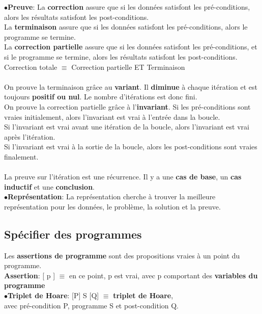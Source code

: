 $\bullet$\textbf{Preuve}:
La \textbf{correction} assure que si les données satisfont les pré-conditions, alors les résultats satisfont les post-conditions.\\
La \textbf{terminaison} assure que si les données satisfont les pré-conditions, alors le programme se termine.\\
La \textbf{correction partielle} assure que si les données satisfont les pré-conditions, et si le programme se termine, alors les résultats satisfont les post-conditions.\\
Correction totale $\equiv$ Correction partielle ET Terminaison
\\ \vspace{1,5mm}\\
On prouve la terminaison grâce au \textbf{variant}. Il \textbf{diminue} à chaque itération et est toujours \textbf{positif ou nul}. Le nombre d'itérations est donc fini.\\
On prouve la correction partielle grâce à l'\textbf{invariant}. Si les pré-conditions sont vraies initialement, alors l'invariant est vrai à l'entrée dans la boucle.\\ Si l'invariant est vrai avant une itération de la boucle, alors l'invariant est vrai après l'itération.\\ Si l'invariant est vrai à la sortie de la boucle, alors les post-conditions sont vraies finalement.\\ \vspace{1,5mm}\\
La preuve sur l'itération est une récurrence. Il y a une \textbf{cas de base}, un \textbf{cas inductif} et une \textbf{conclusion}.\\

$\bullet$\textbf{Représentation}:
La représentation cherche à trouver la meilleure représentation pour les données, le problème, la solution et la preuve.
\subsection{Spécifier des programmes}
Les \textbf{assertions de programme} sont des propositions vraies à un point du programme.\\

\textbf{Assertion}: [ p ] $\equiv $ en ce point, p est vrai, avec p comportant des \textbf{variables du programme}\\

$\bullet$\textbf{Triplet de Hoare}:
[P] S [Q] $\equiv$ \textbf{triplet de Hoare}, \\ avec pré-condition P, programme S et post-condition Q.\\

